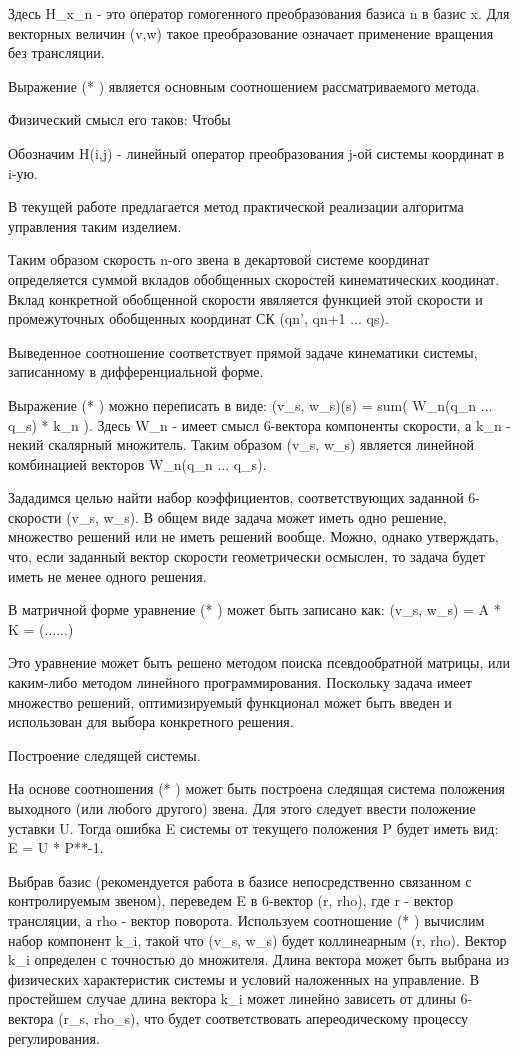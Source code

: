 \documentclass[12pt,a4paper,titlepage]{article}
\begin{document}
Здесь H\_x\_n - это оператор гомогенного преобразования базиса n в базис x. Для векторных величин (v,w) такое преобразование означает применение вращения без трансляции.

Выражение (* ) является основным соотношением рассматриваемого метода.

Физический смысл его таков: Чтобы 

Обозначим H(i,j) - линейный оператор преобразования j-ой системы координат в i-ую. 

В текущей работе предлагается метод практической реализации алгоритма управления таким изделием.

Таким образом скорость n-ого звена в декартовой системе координат определяется суммой вкладов обобщенных скоростей кинематических коодинат. Вклад конкретной обобщенной скорости явяляется функцией этой скорости и промежуточных обобщенных координат СК (qn', qn+1 ... qs).

Выведенное соотношение соответствует прямой задаче кинематики системы, записанному в дифференциальной форме.

Выражение (* ) можно переписать в виде:
(v\_s, w\_s)(s) = sum( W\_n(q\_n ... q\_s) * k\_n ). Здесь W\_n - имеет смысл 6-вектора компоненты скорости, а k\_n - некий скалярный множитель. Таким образом (v\_s, w\_s) является линейной комбинацией векторов W\_n(q\_n ... q\_s).

Зададимся целью найти набор коэффициентов, соответствующих заданной 6-скорости (v\_s, w\_s). В общем виде задача может иметь одно решение, множество решений или не иметь решений вообще. Можно, однако утверждать, что, если заданный вектор скорости геометрически осмыслен, то задача будет иметь не менее одного решения.

В матричной форме уравнение (* ) может быть записано как:
(v\_s, w\_s) = A * K = (......)

Это уравнение может быть решено методом поиска псевдообратной матрицы, или каким-либо методом линейного программирования. Поскольку задача имеет множество решений, оптимизируемый функционал может быть введен и использован для выбора конкретного решения.

Построение следящей системы. 

На основе соотношения (* ) может быть построена следящая система положения выходного (или любого другого) звена. Для этого следует ввести положение уставки U. Тогда ошибка E системы от текущего положения P будет иметь вид:
E = U * P**-1. 

Выбрав базис (рекомендуется работа в базисе непосредственно связанном с контролируемым звеном), переведем E в 6-вектор (r, rho), где r - вектор трансляции, а rho - вектор поворота. Используем соотношение (* ) вычислим набор компонент k\_i, такой что (v\_s, w\_s) будет коллинеарным (r, rho). Вектор k\_i определен с точностью до множителя. Длина вектора может быть выбрана из физических характеристик системы и условий наложенных на управление. В простейшем случае длина вектора k\_i может линейно зависеть от длины 6-вектора (r\_s, rho\_s), что будет соответствовать апереодическому процессу регулирования.   
\end{document}
